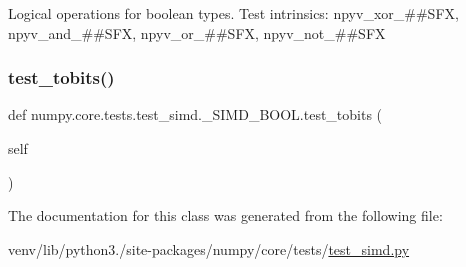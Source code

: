 \begin{DoxyVerb}Logical operations for boolean types.
Test intrinsics:
    npyv_xor_##SFX, npyv_and_##SFX, npyv_or_##SFX, npyv_not_##SFX
\end{DoxyVerb}
 \mbox{\label{classnumpy_1_1core_1_1tests_1_1test__simd_1_1__SIMD__BOOL_a1d691dfc0b1787fb23075f5aa1584c44}} 
\subsubsection{\texorpdfstring{test\+\_\+tobits()}{test\_tobits()}}
{\footnotesize\ttfamily def numpy.\+core.\+tests.\+test\+\_\+simd.\+\_\+\+S\+I\+M\+D\+\_\+\+B\+O\+O\+L.\+test\+\_\+tobits (\begin{DoxyParamCaption}\item[{}]{self }\end{DoxyParamCaption})}



The documentation for this class was generated from the following file\+:\begin{DoxyCompactItemize}
\item 
venv/lib/python3./site-\/packages/numpy/core/tests/\hyperlink{test__simd_8py}{test\+\_\+simd.\+py}\end{DoxyCompactItemize}
